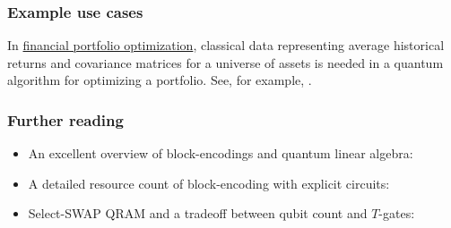 \begin{refsection}
\subsubsection*{Example use cases}
In \hyperref[appl:PortfolioOptimization]{financial portfolio optimization}, classical data representing average historical returns and covariance matrices for a universe of assets is needed in a quantum algorithm for optimizing a portfolio. See, for example, \cite{dalzell2022socp}.


\subsubsection*{Further reading}

\begin{itemize}
    \item An excellent overview of block-encodings and quantum linear algebra: \cite{gilyen2018QSingValTransf}
    \item A detailed resource count of block-encoding with explicit circuits: \cite{clader2022resourcesForBlockEncoding}
    \item Select-SWAP QRAM and a tradeoff between qubit count and $T$-gates: \cite{low2018tradingTgatesforDirtyQubits}
\end{itemize}
\printbibliography[heading=secbib,segment=\therefsegment]

\end{refsection}

